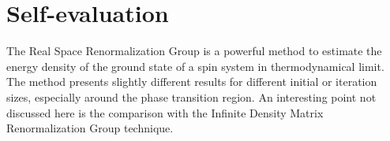 \documentclass[11pt,a4paper]{article}
\begin{document}
\section{Self-evaluation} %

The Real Space Renormalization Group is a powerful method to estimate the energy density of the ground state of a spin system in thermodynamical limit. 
The method presents slightly different results for different initial or iteration sizes, especially around the phase transition region.
An interesting point not discussed here is the comparison with the Infinite Density Matrix Renormalization Group technique.

	
\end{document}
